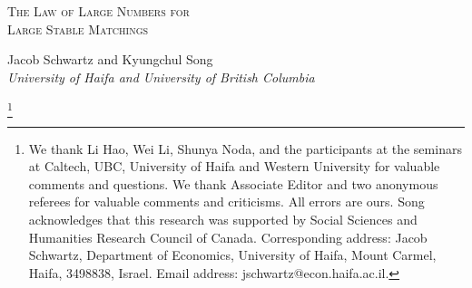 \documentclass[12pt, fullpage]{amsart}
\title{}
\theoremstyle{definition}
\theoremstyle{definition}
\theoremstyle{definition}
\begin{document}
	\vspace*{3ex minus 1ex}
	\begin{center}
		\LARGE \textsc{The Law of Large Numbers for \\Large Stable Matchings}
		\bigskip
			\bigskip
				\bigskip
	\end{center}
	
	\date{%
		\today%
	}
	
	\vspace*{3ex minus 1ex}
	\begin{center}
		Jacob Schwartz and Kyungchul Song\\
		\textit{University of Haifa and University of British Columbia}
	\end{center}
	
	\thanks{We thank Li Hao, Wei Li, Shunya Noda, and the participants at the seminars at Caltech, UBC, University of Haifa and Western University for valuable comments and questions. We thank Associate Editor and two anonymous referees for valuable comments and criticisms. All errors are ours. Song acknowledges that this research was supported by Social Sciences and Humanities Research Council of Canada. Corresponding address: Jacob Schwartz, Department of Economics, University of Haifa, Mount Carmel, Haifa, 3498838, Israel. Email address: jschwartz@econ.haifa.ac.il.}

	
	
\end{document}
